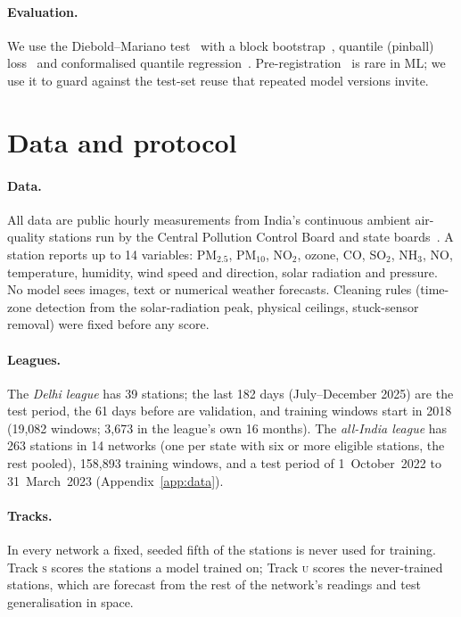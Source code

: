 \documentclass{article}
\newcommand{\pmtf}{PM$_{2.5}$}
\newcommand{\trk}[1]{\textsc{#1}}
\begin{document}
\paragraph{Evaluation.} We use the Diebold--Mariano test~\citep{diebold1995dm} with a block
bootstrap~\citep{kunsch1989bootstrap}, quantile (pinball) loss~\citep{koenker1978quantile,gneiting2007scoring} and
conformalised quantile regression~\citep{romano2019cqr}. Pre-registration~\citep{nosek2018prereg} is rare in ML; we
use it to guard against the test-set reuse that repeated model versions invite.

\section{Data and protocol}
\label{sec:data}

\paragraph{Data.} All data are public hourly measurements from India's continuous ambient air-quality stations run by
the Central Pollution Control Board and state boards~\citep{cpcb,opencity,kaggleaq}. A station reports up to 14
variables: \pmtf{}, PM$_{10}$, NO$_2$, ozone, CO, SO$_2$, NH$_3$, NO, temperature, humidity, wind speed and direction,
solar radiation and pressure. No model sees images, text or numerical weather forecasts. Cleaning rules (time-zone
detection from the solar-radiation peak, physical ceilings, stuck-sensor removal) were fixed before any score.

\paragraph{Leagues.} The \emph{Delhi league} has 39 stations; the last 182 days (July--December 2025) are the test
period, the 61 days before are validation, and training windows start in 2018 (19,082 windows; 3,673 in the league's
own 16 months). The \emph{all-India league} has 263 stations in 14 networks (one per state with six or more eligible
stations, the rest pooled), 158,893 training windows, and a test period of 1~October~2022 to 31~March~2023
(Appendix~\ref{app:data}).

\paragraph{Tracks.} In every network a fixed, seeded fifth of the stations is never used for training. Track
\trk{s} scores the stations a model trained on; Track \trk{u} scores the never-trained stations, which are forecast
from the rest of the network's readings and test generalisation in space.
\end{document}

